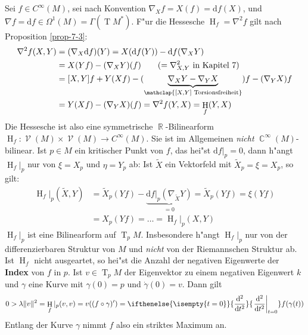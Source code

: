 \documentclass[paper=A4, twoside, chapterprefix=true, bibliography=totoc, headsepline]{scrbook}
\DeclareMathOperator{\C}{\mathbb{C}}
\DeclareMathOperator{\R}{\mathbb{R}}
\DeclareMathOperator{\calV}{\mathcal{V}}
\DeclareMathOperator{\Hh}{H}        %
\DeclareMathOperator{\T}{T}         %
\newcommand{\dop}{\mathrm{d}}
\newcommand{\X}{\times}
\newcommand{\difffrac}[3][]{\ifthenelse{\isempty{#1}}{\frac{\dop #2}{\dop #3}}{\left. \frac{\dop #2}{\dop #3} \right|_{#1}}}
\theoremstyle{plain}
\theoremstyle{nonumberplain}
\theoremstyle{empty}
\theoremstyle{break}
\newcommand{\CmIndex}[2][]{\ifthenelse{\isempty{#1}}{\index{#2}}{\index{#1}}#2}
\newcommand{\CmMark}[2][]{\textbf{\CmIndex[#1]{#2}}}
\begin{document}
Sei $f \in C^\infty(M)$, sei nach Konvention $\nabla_X f = X(f) = \dop f(X)$, und $\nabla f = \dop f \in \Omega^1(M) = \Gamma(\T M^*)$. F"ur die Hessesche $\Hh_f = \nabla^2 f$ gilt nach Proposition
\ref{prop-7-3}:
\begin{align*}
  \nabla^2 f (X,Y) &= (\nabla_X \dop f)(Y) = X(\dop f(Y)) - \dop f(\nabla_X Y)\\
  &= X(Yf) - (\nabla_X Y)(f) \qquad (= \nabla_{X,Y}^2 \text{ in Kapitel 7})\\
  &= [X,Y]f + Y(Xf) - (\underbrace{\nabla_X Y - \nabla_Y X}_{\mathclap{[X,Y] \text{ Torsionsfreiheit}}}) f - (\nabla_Y X) f\\
  &= Y(Xf) - (\nabla_YX)(f) = \nabla^2 f(Y,X) = \Hh_f(Y,X)
\end{align*}
Die Hessesche ist also eine symmetrische $\R$-Bilinearform $\Hh_f: \calV(M) \X \calV(M) \to C^\infty(M)$.
Sie ist im Allgemeinen \emph{nicht} $\C^\infty(M)$-bilinear.
Ist $p \in M$ ein kritischer Punkt von $f$, das hei"st $\dop f|_p = 0$, dann h"angt $\Hh_f|_p$ nur von $\xi = X_p$ und $\eta = Y_p$ ab:
Ist $\tilde X$ ein Vektorfeld mit $\tilde X_p = \xi = X_p$, so gilt:
\begin{align*}
  \Hh_f|_p(\tilde X,Y) &= \tilde X_p(Yf) - \underbrace{\dop f|_p(\nabla_{\tilde X}Y)}_{=0} = \tilde X_p(Yf) = \xi(Yf)\\
  &= X_p(Yf) = \ldots = \Hh_f|_p(X,Y)
\end{align*}
$\Hh_f|_p$ ist eine Bilinearform auf $\T_pM$. Insbesondere h"angt $\Hh_f|_p$ nur von der differenzierbaren Struktur von $M$ und \emph{nicht} von der Riemannschen Struktur ab.
Ist $\Hh_f$ nicht ausgeartet, so hei"st die Anzahl der negativen Eigenwerte der \CmMark{Index} von $f$ in $p$.
Ist $v \in \T_pM$ der Eigenvektor zu einem negativen Eigenwert $k$ und $\gamma$ eine Kurve mit
$\gamma(0)=p$ und $\dot\gamma(0)=v$.
Dann gilt
\begin{align*}
  0 > \lambda \| v \|^2 = \Hh_f|_p (v,v) = v((f \circ \gamma)') =
  \difffrac[t=0]{^2}{t^2} f(\gamma(t))
\end{align*}
Entlang der Kurve $\gamma$ nimmt $f$ also ein striktes Maximum an.
\end{document}
